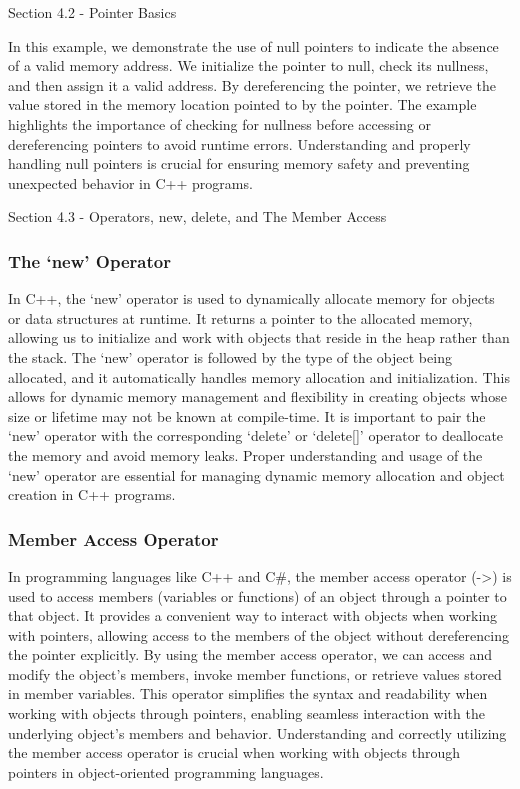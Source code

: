 \begin{notes}{Section 4.2 - Pointer Basics}
\begin{highlight}
        In this example, we demonstrate the use of null pointers to indicate the absence of a valid memory address. We initialize the pointer to null, check its nullness, and then assign it a valid address. By dereferencing the pointer, we 
        retrieve the value stored in the memory location pointed to by the pointer. The example highlights the importance of checking for nullness before accessing or dereferencing pointers to avoid runtime errors. Understanding and properly 
        handling null pointers is crucial for ensuring memory safety and preventing unexpected behavior in C++ programs.
    \end{highlight}
\end{notes}

\begin{notes}{Section 4.3 - Operators, new, delete, and The Member Access}
    \subsubsection*{The `new' Operator}

    In C++, the `new' operator is used to dynamically allocate memory for objects or data structures at runtime. It returns a pointer to the allocated memory, allowing us to initialize and work with objects that reside in the heap rather than 
    the stack. The `new' operator is followed by the type of the object being allocated, and it automatically handles memory allocation and initialization. This allows for dynamic memory management and flexibility in creating objects whose size 
    or lifetime may not be known at compile-time. It is important to pair the `new' operator with the corresponding `delete' or `delete[]' operator to deallocate the memory and avoid memory leaks. Proper understanding and usage of the `new' 
    operator are essential for managing dynamic memory allocation and object creation in C++ programs.
    
    \subsubsection*{Member Access Operator}
    
    In programming languages like C++ and C\#, the member access operator (->) is used to access members (variables or functions) of an object through a pointer to that object. It provides a convenient way to interact with objects when working 
    with pointers, allowing access to the members of the object without dereferencing the pointer explicitly. By using the member access operator, we can access and modify the object's members, invoke member functions, or retrieve values stored 
    in member variables. This operator simplifies the syntax and readability when working with objects through pointers, enabling seamless interaction with the underlying object's members and behavior. Understanding and correctly utilizing the 
    member access operator is crucial when working with objects through pointers in object-oriented programming languages.
    

\end{notes}
